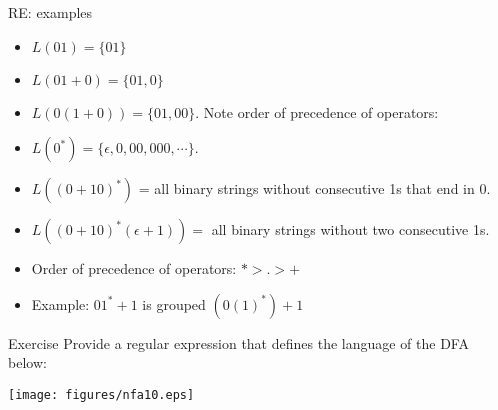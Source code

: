 \documentclass{prosper}%
\begin{document}
\begin{slide}{RE: examples}
\begin{itemize}
\item $L(01) = \{01\}$
\item $L(01+0) = \{01, 0\}$
\item $L(0(1+0)) = \{01, 00\}$. Note order of precedence of operators:
\item $L(0^*) = \{\epsilon, 0, 00, 000,\cdots \}$. 
\item $L((0+10)^*)$ = all binary strings without consecutive 1s that end in 0. 
\item $L((0+10)^{*}(\epsilon+1)) = $ all binary strings without two consecutive 1s.
\end{itemize}
\begin{itemize}
\item Order of precedence of operators: $*>.>+$
\item Example: $01^*+ 1$ is grouped $(0(1)^*) + 1$
\end{itemize}
\end{slide}

\begin{comment}
\begin{slide}{RE: examples}
\begin{center}
\texttt{[image: figures/re2.eps]}
\end{center}
\begin{itemize}
\item Order of precedence of operators: $*>.>+$
\item Example: $01^*+ 1$ is grouped $(0(1)^*) + 1$
\end{itemize}
\end{slide}

\begin{slide}{More Examples}
Here are some languages and their respective REs:
\begin{itemize}
\item The set of strings over alphabet $\{a,b\}$ containing at least one $a$ and at least one $b$
\[ (a+b)^*a(a+b)^*b(a+b)^*+(a+b)^*b(a+b)^*a(a+b)^*
\]
\item The set of strings over the alphabet $\{0,1\}$ whose third symbol from the right end is 1
\[
(0+1)^*1(0+1)(0+1)(0+1)
\]
\end{itemize}
\end{slide}
\end{comment}

\begin{slide}{Exercise}
Provide a regular expression that defines the language of the  DFA below:
\begin{center}
\texttt{[image: figures/nfa10.eps]}
\end{center}
\end{slide}
\end{document}
